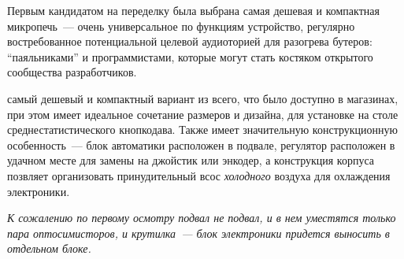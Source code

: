 \clearpage
Первым кандидатом на переделку была выбрана самая дешевая и компактная
микропечь\ --- очень универсальное по функциям устройство, регулярно
востребованное потенциальной целевой аудиоторией для разогрева бутеров:
``паяльниками'' и программистами, которые могут стать костяком открытого
сообщества разработчиков.


\noindent
{} самый дешевый
и компактный вариант из всего, что было доступно в магазинах, при этом имеет
идеальное сочетание размеров и дизайна, для установке на столе
среднестатистического кнопкодава. Также имеет значительную конструкционную
особенность\ --- блок автоматики расположен в подвале, регулятор расположен в
удачном месте для замены на джойстик или энкодер, а конструкция корпуса позвляет
организовать принудительный всос \emph{холодного} воздуха для охлаждения
электроники.

\bigskip\textit{
К сожалению по первому осмотру подвал не подвал, и в нем уместятся только пара
оптосимисторов, и крутилка\ --- блок электроники придется выносить в отдельном
блоке.}


